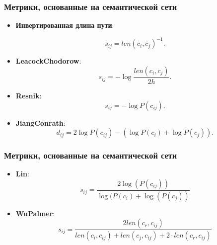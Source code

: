 \begin{frame}
\frametitle{Метрики, основанные на семантической сети}

\begin{itemize}

\item \textbf{Инвертированная длина пути}:

$$
s_{ij}=len(c_i,c_j)^{-1}.
$$

\item \textbf{LeacockChodorow}: 
$$
s_{ij}=-\log\frac{len(c_i,c_j)}{2h}.
$$

\item \textbf{Resnik}: 
$$
s_{ij}=-\log P(c_{ij}).
$$ 


\item \textbf{JiangConrath}: 
$$
d_{ij}= 2 \log P(c_{ij}) - (\log P(c_i) + \log P(c_j)).
$$

\end{itemize}

\end{frame}






\begin{frame}
\frametitle{Метрики, основанные на семантической сети}


\begin{itemize}

\item \textbf{Lin}: $$ s_{ij}= \frac{2 \log(P(c_{ij}))}{\log(P(c_i) + \log(P(c_j))  } $$

\item \textbf{WuPalmer}: 
$$ s_{ij}=\frac{2  len(c_{r},c_{ij})}{len(c_i,c_{ij})+len(c_j,c_{ij})+2\cdot len(c_{r},c_{ij})} $$
 
\end{itemize}
\end{frame}






